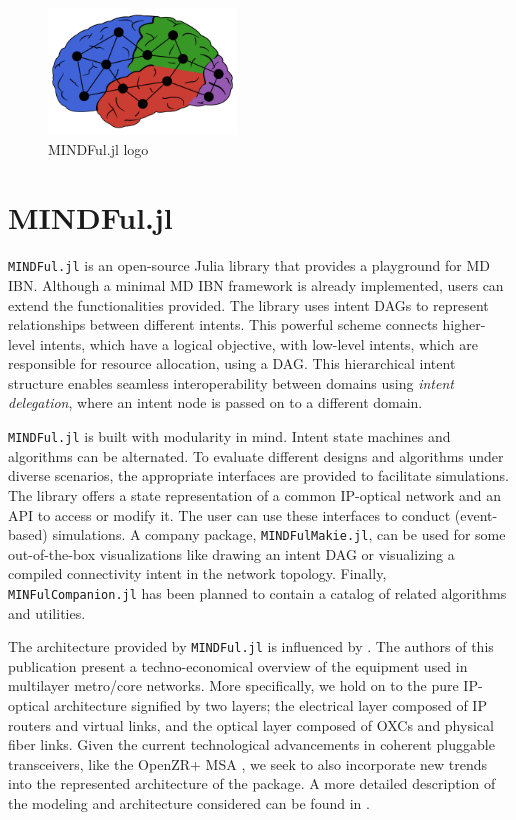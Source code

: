 \documentclass{juliacon}
\begin{document}
    \begin{figure}[b]
    \centerline{\includegraphics[width=5cm]{logo.pdf}}
    \caption{MINDFul.jl logo}
        \label{fig:logo}
    \end{figure}

\section{MINDFul.jl}
\verb|MINDFul.jl| is an open-source Julia library that provides a playground for \ac{MD} \ac{IBN}.
Although a minimal \ac{MD} \ac{IBN} framework is already implemented, users can extend the functionalities provided.
The library uses intent \acp{DAG} \cite{2023ChristouITG} to represent relationships between different intents.
This powerful scheme connects higher-level intents, which have a logical objective, with low-level intents, which are responsible for resource allocation, using a \ac{DAG}.
This hierarchical intent structure enables seamless interoperability between domains using \emph{intent delegation}, where an intent node is passed on to a different domain.

\verb|MINDFul.jl| is built with modularity in mind.
Intent state machines and algorithms can be alternated.
To evaluate different designs and algorithms under diverse scenarios, the appropriate interfaces are provided to facilitate simulations. 
The library offers a state representation of a common IP-optical network and an \ac{API} to access or modify it. 
The user can use these interfaces to conduct (event-based) simulations.
A company package, \verb|MINDFulMakie.jl|, can be used for some out-of-the-box visualizations like drawing an intent \ac{DAG} or visualizing a compiled connectivity intent in the network topology.
Finally, \verb|MINFulCompanion.jl| has been planned to contain a catalog of related algorithms and utilities.

The architecture provided by \verb|MINDFul.jl| is influenced by \cite{2013Rambach}.
The authors of this publication present a techno-economical overview of the equipment used in multilayer metro/core networks.
More specifically, we hold on to the pure IP-optical architecture signified by two layers; the electrical layer composed of IP routers and virtual links, and the optical layer composed of \acp{OXC} and physical fiber links.
Given the current technological advancements in coherent pluggable transceivers, like the OpenZR+ \ac{MSA} \cite{OpenZRProps}, we seek to also incorporate new trends into the represented architecture of the package.
A more detailed description of the modeling and architecture considered can be found in \cite{2022ChristouPlug}.
\end{document}
